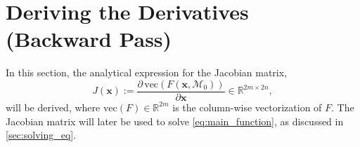 \newpage
\section{Deriving the Derivatives (Backward Pass)}
\label{sec:der_jacobian}

In this section, the analytical expression for the Jacobian matrix,
\begin{equation*}
    J(\mathbf{x}):=\frac{\partial\,\mathrm{vec}(F(\mathbf{x},\mathcal{M}_0))}{\partial \mathbf{x}} \in \mathbb{R}^{2m\times 2n},
\end{equation*}
will be derived, where $\mathrm{vec}(F)\in \mathbb{R}^{2m}$ is the column-wise vectorization of $F$. The Jacobian matrix will later be used to solve \cref{eq:main_function}, as discussed in \autoref{sec:solving_eq}.\\

